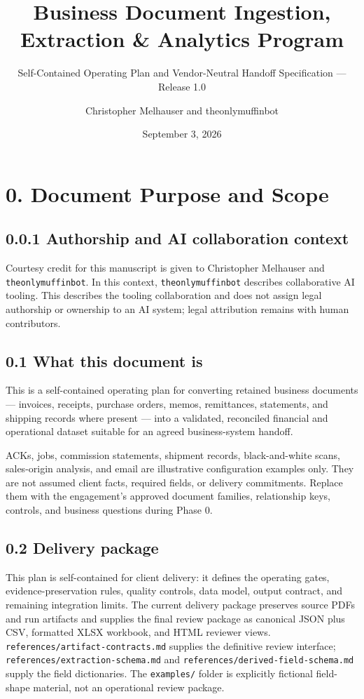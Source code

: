 \documentclass[
]{article}
\title{Business Document Ingestion, Extraction \& Analytics Program}
\subtitle{Self-Contained Operating Plan and Vendor-Neutral Handoff
Specification --- Release 1.0}
\author{Christopher Melhauser and theonlymuffinbot}
\date{September 3, 2026}
\begin{document}
\maketitle

\section{0. Document Purpose and
Scope}\label{document-purpose-and-scope}

\subsection{0.0.1 Authorship and AI collaboration
context}\label{authorship-and-ai-collaboration-context}

Courtesy credit for this manuscript is given to Christopher Melhauser
and \texttt{theonlymuffinbot}. In this context,
\texttt{theonlymuffinbot} describes collaborative AI tooling. This
describes the tooling collaboration and does not assign legal authorship
or ownership to an AI system; legal attribution remains with human
contributors.

\subsection{0.1 What this document is}\label{what-this-document-is}

This is a self-contained operating plan for converting retained business
documents --- invoices, receipts, purchase orders, memos, remittances,
statements, and shipping records where present --- into a validated,
reconciled financial and operational dataset suitable for an agreed
business-system handoff.

ACKs, jobs, commission statements, shipment records, black-and-white
scans, sales-origin analysis, and email are illustrative configuration
examples only. They are not assumed client facts, required fields, or
delivery commitments. Replace them with the engagement's approved
document families, relationship keys, controls, and business questions
during Phase 0.

\subsection{0.2 Delivery package}\label{delivery-package}

This plan is self-contained for client delivery: it defines the
operating gates, evidence-preservation rules, quality controls, data
model, output contract, and remaining integration limits. The current
delivery package preserves source PDFs and run artifacts and supplies
the final review package as canonical JSON plus CSV, formatted XLSX
workbook, and HTML reviewer views.
\texttt{references/\allowbreak{}artifact-\allowbreak{}contracts.md}
supplies the definitive review interface;
\texttt{references/\allowbreak{}extraction-\allowbreak{}schema.md} and
\texttt{references/\allowbreak{}derived-\allowbreak{}field-\allowbreak{}schema.md}
supply the field dictionaries. The \texttt{examples/\allowbreak{}}
folder is explicitly fictional field-shape material, not an operational
review package.
\end{document}
